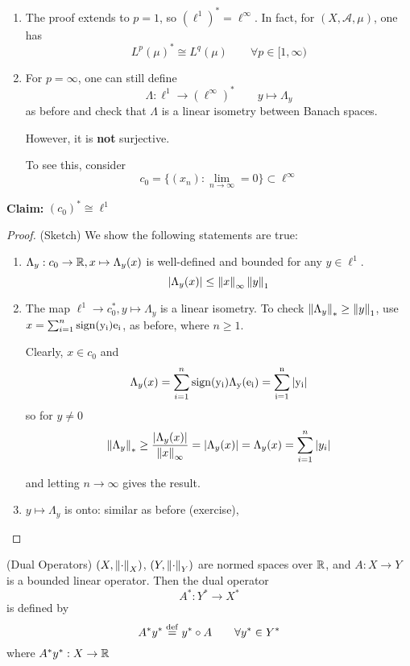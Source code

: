 \documentclass{article}
\begin{document}
\begin{remark}
    \begin{enumerate}[1)]
        \item The proof extends to  \(p=1\), so  \((\ell^1)^* = \ell^{\infty}\). In fact, for  \((X, \mathcal{A}, \mu)\), one has  
        \[L^p(\mu)^* \cong L^q(\mu) \qquad \forall p \in [1, \infty)\]
        \item For  \(p=\infty\), one can still define  
        \[\Lambda: \ell^1 \to (\ell^{\infty})^* \qquad y \mapsto \Lambda_y\]
        as before and check that  \(\Lambda\) is a linear isometry between Banach spaces.
        
        However, it is \textbf{not} surjective.  
        
        To see this, consider 
        \[c_0 = \{(x_n): \lim_{n \to \infty} = 0\} \subset \ell^{\infty}\]
    \end{enumerate}

\textbf{Claim:} \((c_0)^* \cong \ell^1\ \)
\begin{proof}
    (Sketch) We show the following statements are true:
    \begin{enumerate}[1)]
        \item \(\Lambda_y: c_0 \to \mathbb{R}, x \mapsto \Lambda_y(x)\) is well-defined and bounded for any 
         \(y \in \ell^1\).  
        \[|\Lambda_y(x)| \leq \left\|{x}\right\|_{\infty} \left\|{y}\right\|_1\]

        \item The map \( \ell^1 \to c_0^*, y \mapsto \Lambda_y\) is a linear isometry. To check 
        \(\left\|{\Lambda_y}\right\|_* \geq \left\|{y}\right\|_1\), use \(x = \sum_{i=1}^n \rm{sign}(y_i)e_i\), as before, where
        \(n \geq 1\).  

        Clearly, \(x \in c_0\) and  
        \[\Lambda_y(x) = \sum_{i=1}^n \rm{sign}(y_i) \Lambda_y(e_i)=\sum_{i=1}^n |y_i|\]
        so for \(y \neq 0\)  
        \[\left\|{\Lambda_y}\right\|_* \geq \frac{|\Lambda_y(x)|}{\left\|{x}\right\|_{\infty}}=|\Lambda_y(x)|=\Lambda_y(x)=\sum_{i=1}^n |y_i|\]

        and letting \(n \to \infty\) gives the result.  

        \item \(y \mapsto \Lambda_y\) is onto: similar as before (exercise),
    \end{enumerate}
\end{proof}
\end{remark}  

\begin{definition}
    (Dual Operators) 
    \((X, \left\|{\cdot}\right\|_X)\), \((Y, \left\|{\cdot}\right\|_Y)\) are normed spaces over \(\mathbb{R}\), and \(A: X \to Y\) is a bounded linear operator.  
    Then the dual operator 
    \[A^*: Y^* \to X^*\]
    is defined by  
    \[A^* y^* \overset{\rm{def}}{=} y^* \circ A \qquad \forall y^* \in Y^* \]
    where \(A^* y^* : X \to \mathbb{R}\)
\end{definition}  
\end{document}
